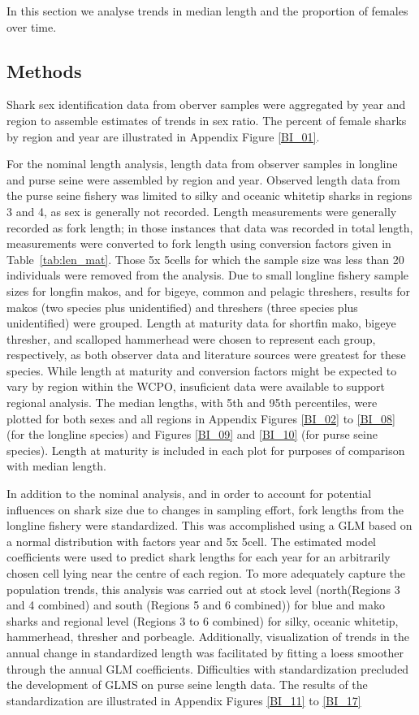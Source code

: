 \documentclass[12pt]{SCreport}
\begin{document}
In this section we analyse trends in median length and the proportion of females over time.  
      

\subsection{Methods}\label{bi:methods}
Shark sex identification data from oberver samples were aggregated by year and region to assemble estimates of trends in sex ratio.  The percent of female sharks by region and year are illustrated in Appendix Figure \ref{BI_01}.
  
For the nominal length analysis, length data from observer samples in longline and purse seine were assembled by region and year.  Observed length data from the purse seine fishery was limited to silky and oceanic whitetip sharks in regions 3 and 4, as sex is generally not recorded.  Length measurements were generally recorded as fork length; in those instances that data was recorded in total length, measurements were converted to fork length using conversion factors given in Table~\ref{tab:len_mat}. Those 5\degree x 5\degree cells for which the sample size was less than 20 individuals were removed from the analysis.  Due to small longline fishery sample sizes for longfin makos, and for bigeye, common and pelagic threshers, results for makos (two species plus unidentified) and threshers (three species plus unidentified) were grouped. Length at maturity data for shortfin mako, bigeye thresher, and scalloped hammerhead were chosen to represent each group, respectively, as both observer data and literature sources were greatest for these species. While length at maturity and conversion factors might be expected to vary by region within the WCPO, insuficient data
were available to support regional analysis. The median lengths, with 5th and 95th percentiles, were plotted for both sexes and all regions in Appendix Figures \ref{BI_02} to \ref{BI_08} (for the longline species) and Figures \ref{BI_09} and \ref{BI_10} (for purse seine species).  Length at maturity is included in each plot for purposes of comparison with median length.

In addition to the nominal analysis, and in order to account for potential influences on shark size due to changes in sampling effort, fork lengths from the longline fishery were standardized. This was accomplished using a GLM based on a normal distribution with factors year and 5\degree x 5\degree cell. The estimated model coefficients were used to predict shark lengths for each year for an arbitrarily chosen cell lying near the centre of each region. To more adequately capture the population trends, this analysis was carried out at stock level (north(Regions 3 and 4 combined) and south (Regions 5 and 6 combined)) for blue and mako sharks and regional level (Regions 3 to 6 combined) for silky, oceanic whitetip, hammerhead, thresher and porbeagle.  Additionally, visualization of trends in the annual change in standardized length was facilitated by fitting a loess smoother through the annual GLM coefficients.  Difficulties with standardization precluded the development of GLMS on purse seine length data. The results of the standardization are illustrated in Appendix Figures \ref{BI_11} to \ref{BI_17}
\end{document}
